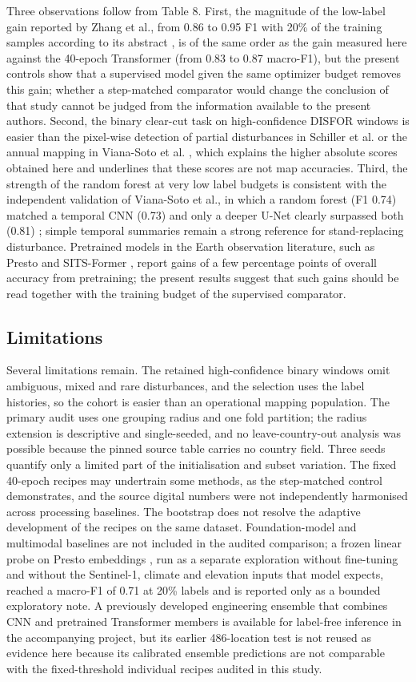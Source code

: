 \documentclass[10pt,a4paper,twocolumn]{article}
\begin{document}
Three observations follow from Table 8. First, the magnitude of the low-label gain reported by Zhang et al., from 0.86 to 0.95 F1 with 20\% of the training samples according to its abstract \cite{ref2}, is of the same order as the gain measured here against the 40-epoch Transformer (from 0.83 to 0.87 macro-F1), but the present controls show that a supervised model given the same optimizer budget removes this gain; whether a step-matched comparator would change the conclusion of that study cannot be judged from the information available to the present authors. Second, the binary clear-cut task on high-confidence DISFOR windows is easier than the pixel-wise detection of partial disturbances in Schiller et al. \cite{ref27} or the annual mapping in Viana-Soto et al. \cite{ref28}, which explains the higher absolute scores obtained here and underlines that these scores are not map accuracies. Third, the strength of the random forest at very low label budgets is consistent with the independent validation of Viana-Soto et al., in which a random forest (F1 0.74) matched a temporal CNN (0.73) and only a deeper U-Net clearly surpassed both (0.81) \cite{ref28}; simple temporal summaries remain a strong reference for stand-replacing disturbance. Pretrained models in the Earth observation literature, such as Presto \cite{ref7} and SITS-Former \cite{ref10}, report gains of a few percentage points of overall accuracy from pretraining; the present results suggest that such gains should be read together with the training budget of the supervised comparator.

\subsection{Limitations}
Several limitations remain. The retained high-confidence binary windows omit ambiguous, mixed and rare disturbances, and the selection uses the label histories, so the cohort is easier than an operational mapping population. The primary audit uses one grouping radius and one fold partition; the radius extension is descriptive and single-seeded, and no leave-country-out analysis was possible because the pinned source table carries no country field. Three seeds quantify only a limited part of the initialisation and subset variation. The fixed 40-epoch recipes may undertrain some methods, as the step-matched control demonstrates, and the source digital numbers were not independently harmonised across processing baselines. The bootstrap does not resolve the adaptive development of the recipes on the same dataset. Foundation-model and multimodal baselines are not included in the audited comparison; a frozen linear probe on Presto embeddings \cite{ref7}, run as a separate exploration without fine-tuning and without the Sentinel-1, climate and elevation inputs that model expects, reached a macro-F1 of 0.71 at 20\% labels and is reported only as a bounded exploratory note. A previously developed engineering ensemble that combines CNN and pretrained Transformer members is available for label-free inference in the accompanying project, but its earlier 486-location test is not reused as evidence here because its calibrated ensemble predictions are not comparable with the fixed-threshold individual recipes audited in this study.
\end{document}

